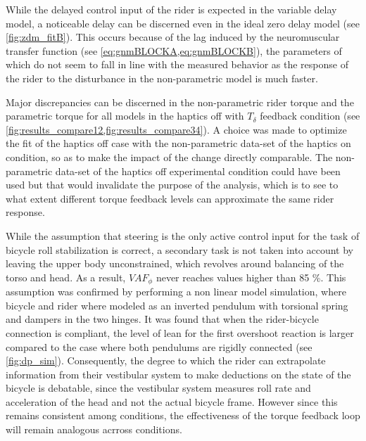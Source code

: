 While the delayed control input  of the rider is expected in the variable delay model, a noticeable delay can be discerned even in the ideal zero delay model (see \cref{fig:zdm_fitB}). This occurs because  of the lag induced by the neuromuscular transfer function (see \cref{eq:gnmBLOCKA,eq:gnmBLOCKB}), the parameters of which do not seem to fall in line with the measured behavior as the response of the rider to the disturbance in the non-parametric model is much faster. 

Major discrepancies can be discerned in the non-parametric rider torque and the parametric torque for all models in the haptics off with \ensuremath{T_\delta} feedback condition (see \cref{fig:results_compare12,fig:results_compare34}). A choice was made to optimize the fit of the haptics off case with the non-parametric data-set of the haptics on condition, so as to make the impact of the change directly comparable. The non-parametric data-set of the haptics off experimental condition could have been used but that would invalidate the  purpose of the analysis, which is to see to what extent different torque feedback levels can approximate the same rider response. 




While the assumption that steering is the only active control input for the task of bicycle roll stabilization is correct, a secondary task is not taken into account by leaving the upper body unconstrained, which revolves around balancing of the torso and head. As a result, \ensuremath{\mathit{VAF}_\phi} never reaches values higher than 85 \%. This assumption  was  confirmed by performing a non linear model simulation, where bicycle and rider where modeled as an inverted pendulum with torsional spring and dampers in the two hinges. It was found that when the rider-bicycle connection is compliant, the level of lean for the first overshoot reaction is larger  compared to the case where both pendulums are rigidly connected (see \cref{fig:dp_sim}). Consequently, the degree to which the rider can extrapolate information from their vestibular system to make deductions on the state of the bicycle is debatable, since the vestibular system measures roll rate and acceleration of the head and not the actual bicycle frame. However since this remains consistent among conditions, the effectiveness of the torque feedback loop will remain analogous acrross conditions.

